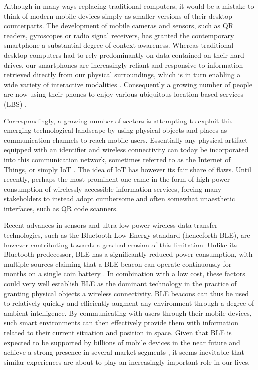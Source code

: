 \documentclass[prodmode,acmtomm]{acmsmall}
\begin{document}
Although in many ways replacing traditional computers, it would be a mistake to think of modern mobile devices simply as smaller versions of their desktop counterparts. The development of mobile cameras and sensors, such as QR readers, gyroscopes or radio signal receivers, has granted the contemporary smartphone a substantial degree of context awareness. Whereas traditional desktop computers had to rely predominantly on data contained on their hard drives, our smartphones are increasingly reliant and responsive to information retrieved directly from our physical surroundings, which is in turn enabling a wide variety of interactive modalities \cite{she2014}. Consequently a growing number of people are now using their phones to enjoy various ubiquitous location-based services (LBS) \cite{liu2013}.

Correspondingly, a growing number of sectors is attempting to exploit this emerging technological landscape by using physical objects and places as communication channels to reach mobile users. Essentially any physical artifact equipped with an identifier and wireless connectivity can today be incorporated into this communication network, sometimes referred to as the Internet of Things, or simply IoT \cite{golding2011}. The idea of IoT has however its fair share of flaws. Until recently, perhaps the most prominent one came in the form of high power consumption of wirelessly accessible information services, forcing many stakeholders to instead adopt cumbersome and often somewhat unaesthetic interfaces, such as QR code scanners. 

Recent advances in sensors and ultra low power wireless data transfer technologies, such as the Bluetooth Low Energy standard (henceforth BLE), are however contributing towards a gradual erosion of this limitation. Unlike its Bluetooth predecessor, BLE has a significantly reduced power consumption, with multiple sources claiming that a BLE beacon can operate continuously for months on a single coin battery \cite{kamath2012}. In combination with a low cost, these factors could very well establish BLE as the dominant technology in the practice of granting physical objects a wireless connectivity. BLE beacons can thus be used to relatively quickly and efficiently augment any environment through a degree of ambient intelligence. By communicating with users through their mobile devices, such smart environments can then effectively provide them with information related to their current situation and position in space. Given that BLE is expected to be supported by billions of mobile devices in the near future\cite{west2013} and achieve a strong presence in several market segments \cite{gomez2012}, it seems inevitable that similar experiences are about to play an increasingly important role in our lives. 
\end{document}
